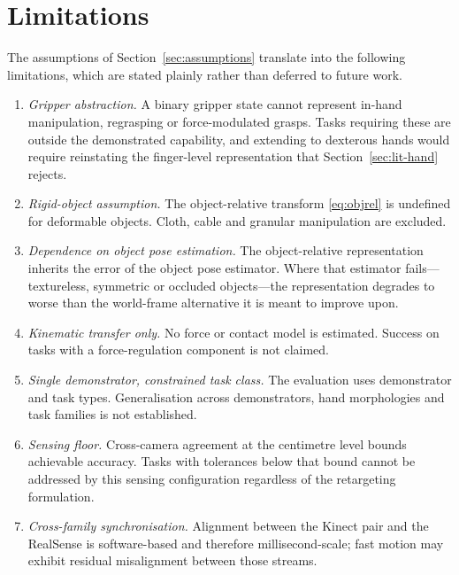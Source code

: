
\section{Limitations}
\label{sec:limitations}

The assumptions of Section~\ref{sec:assumptions} translate into the following
limitations, which are stated plainly rather than deferred to future work.

\begin{enumerate}[leftmargin=2em]
  \item \emph{Gripper abstraction.} A binary gripper state cannot represent
        in-hand manipulation, regrasping or force-modulated grasps. Tasks
        requiring these are outside the demonstrated capability, and extending
        to dexterous hands would require reinstating the finger-level
        representation that Section~\ref{sec:lit-hand} rejects.
  \item \emph{Rigid-object assumption.} The object-relative transform
        \eqref{eq:objrel} is undefined for deformable objects. Cloth, cable and
        granular manipulation are excluded.
  \item \emph{Dependence on object pose estimation.} The object-relative
        representation inherits the error of the object pose estimator. Where
        that estimator fails---textureless, symmetric or occluded objects---the
        representation degrades to worse than the world-frame alternative it is
        meant to improve upon.
  \item \emph{Kinematic transfer only.} No force or contact model is estimated.
        Success on tasks with a force-regulation component is not claimed.
  \item \emph{Single demonstrator, constrained task class.} The evaluation uses
         demonstrator and  task types. Generalisation across
        demonstrators, hand morphologies and task families is not established.
  \item \emph{Sensing floor.} Cross-camera agreement at the centimetre level
        \cite{romeo} bounds achievable accuracy. Tasks with tolerances below
        that bound cannot be addressed by this sensing configuration
        regardless of the retargeting formulation.
  \item \emph{Cross-family synchronisation.} Alignment between the Kinect pair
        and the RealSense is software-based and therefore millisecond-scale;
        fast motion may exhibit residual misalignment between those streams.
\end{enumerate}


